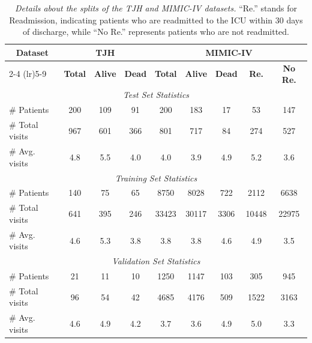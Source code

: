\documentclass{article}
\begin{document}
\begin{table}[!ht]
\footnotesize
\centering
\caption{\textit{Details about the splits of the TJH and MIMIC-IV datasets.} ``Re.'' stands for Readmission, indicating patients who are readmitted to the ICU within 30 days of discharge, while ``No Re.'' represents patients who are not readmitted.}
\label{tab:dataset_split_ehr}
\begin{tabular}{lcccccccc}
\toprule
\multicolumn{1}{c}{\multirow{2}{*}{\textbf{Dataset}}}          & \multicolumn{3}{c}{\textbf{TJH}} & \multicolumn{5}{c}{\textbf{MIMIC-IV}}  \\
\cmidrule(lr){2-4} \cmidrule(lr){5-9}
                & \textbf{Total} & \textbf{Alive} & \textbf{Dead} 
                & \textbf{Total} & \textbf{Alive} & \textbf{Dead} & \textbf{Re.} & \textbf{No Re.} \\
\midrule
\multicolumn{9}{c}{\textit{Test Set Statistics}} \\
\midrule
\# Patients     & 200 & 109 & 91 & 200 & 183 & 17 & 53 & 147 \\
\# Total visits & 967 & 601 & 366 & 801 & 717 & 84 & 274 & 527 \\
\# Avg. visits  & 4.8 & 5.5 & 4.0 & 4.0 & 3.9 & 4.9 & 5.2 & 3.6 \\
\midrule
\multicolumn{9}{c}{\textit{Training Set Statistics}} \\
\midrule
\# Patients     & 140 & 75 & 65 & 8750 & 8028 & 722 & 2112 & 6638 \\
\# Total visits & 641 & 395 & 246 & 33423 & 30117 & 3306 & 10448 & 22975 \\
\# Avg. visits  & 4.6 & 5.3 & 3.8 & 3.8 & 3.8 & 4.6 & 4.9 & 3.5 \\
\midrule
\multicolumn{9}{c}{\textit{Validation Set Statistics}} \\
\midrule
\# Patients     & 21 & 11 & 10 & 1250 & 1147 & 103 & 305 & 945 \\
\# Total visits & 96 & 54 & 42 & 4685 & 4176 & 509 & 1522 & 3163 \\
\# Avg. visits  & 4.6 & 4.9 & 4.2 & 3.7 & 3.6 & 4.9 & 5.0 & 3.3 \\
\bottomrule
\end{tabular}
\end{table}
\end{document}
